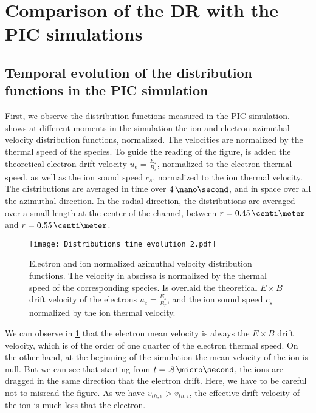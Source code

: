 
\section{Comparison of the \ac{DR} with the \ac{PIC} simulations}
  \label{sec-DR-results}
  
  

  \subsection{Temporal evolution of the distribution functions in the \ac{PIC} simulation} \label{subsec-VDFpic}
  
  First, we observe the distribution functions measured in the \ac{PIC} simulation.
   shows at different moments in the simulation the ion and electron azimuthal velocity distribution functions, normalized.
  The velocities are normalized by the thermal speed of the species.
  To guide the reading of the figure, is added the  theoretical electron drift velocity $u_e = \frac{E_z}{B_r}$, normalized to the electron thermal speed, as well as the ion sound speed $c_s$, normalized to the ion thermal velocity.
  The distributions are averaged in time over $4\,\nano\second$, and in space over all the azimuthal direction.
  In the radial direction, the distributions are averaged over a small length at the center of the channel, between $r=0.45\,\centi\meter$ and $r=0.55\,\centi\meter$.
  
  \begin{figure}[hbtp]
    \centering
    \texttt{[image: Distributions\_time\_evolution\_2.pdf]}
    \caption{Electron and ion normalized azimuthal velocity distribution functions. The velocity in abscissa is normalized by the thermal speed of the corresponding species. Is overlaid the theoretical $E\times B$ drift velocity of the electrons $u_e = \frac{E_z}{B_r}$, and the ion sound speed $c_s$ normalized by the ion thermal velocity.}
    \label{fig-vdfs_pic_time}
  \end{figure}
  
  We can observe in \cref{fig-vdfs_pic_time} that the electron mean velocity is always the $E \times B$ drift velocity, which is of the order of one quarter of the electron thermal speed.
  On the other hand, at the beginning of the simulation the mean velocity of the ion is null.
  But we can see that starting from $t=.8\,\micro\second$, the ions are dragged in the same direction that the electron drift.
  Here, we have to be careful not to misread the figure.
  As we have $v_{th, e} > v_{th, i}$, the effective drift velocity of the ion is much less that the electron.
  
